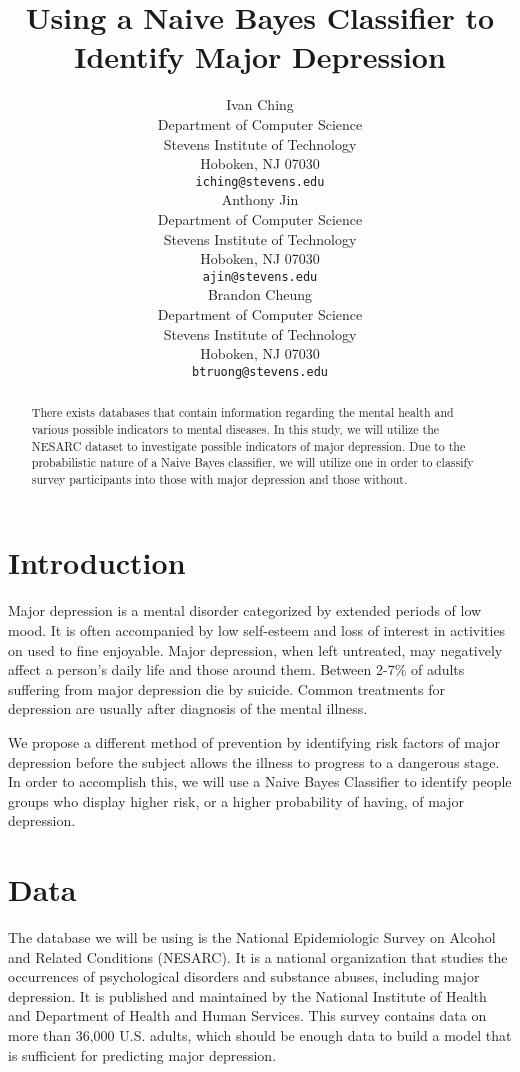 \documentclass{article}
\title{Using a Naive Bayes Classifier to Identify Major Depression}
\author{
  Ivan Ching\\
  Department of Computer Science\\
  Stevens Institute of Technology\\
  Hoboken, NJ 07030 \\
  \texttt{iching@stevens.edu} \\
  \And
  Anthony Jin \\
  Department of Computer Science\\
  Stevens Institute of Technology\\
  Hoboken, NJ 07030 \\
  \texttt{ajin@stevens.edu}\\
  \And
  Brandon Cheung\\
  Department of Computer Science \\
  Stevens Institute of Technology\\
  Hoboken, NJ 07030 \\
  \texttt{btruong@stevens.edu} \\
 }
\begin{document}
\maketitle
\begin{abstract}
 There exists databases that contain information regarding the mental health and various   possible indicators to mental diseases. In this study, we will utilize the NESARC dataset to investigate possible indicators of major depression. Due to the probabilistic nature of a Naive Bayes classifier, we will utilize one in order to classify survey participants into those with major depression and those without.
\end{abstract}

\section{Introduction}

Major depression is a mental disorder categorized by extended periods of low mood. It is often accompanied by low self-esteem and loss of interest in activities on used to fine enjoyable. Major depression, when left untreated, may negatively affect a person's daily life and those around them. Between 2-7\% of adults suffering from major depression die by suicide. Common treatments for depression are usually after diagnosis of the mental illness.

We propose a different method of prevention by identifying risk factors of major depression before the subject allows the illness to progress to a dangerous stage. In order to accomplish this, we will use a Naive Bayes Classifier to identify people groups who display higher risk, or a higher probability of having, of major depression.


\section{Data}
\label{gen_inst}

The database we will be using is the National Epidemiologic Survey on Alcohol and Related Conditions (NESARC). It is a national organization that studies the occurrences of psychological disorders and substance abuses, including major depression. It is published and maintained by the National Institute of Health and Department of Health and Human Services. This survey contains data on more than 36,000 U.S. adults, which should be enough data to build a model that is sufficient for predicting major depression.
\end{document}
